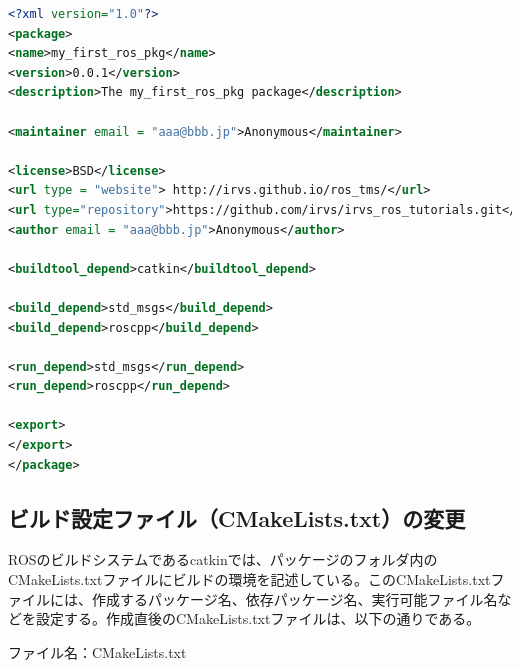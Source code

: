 \begin{lstlisting}[language=XML]
<?xml version="1.0"?>
<package>
<name>my_first_ros_pkg</name>
<version>0.0.1</version>
<description>The my_first_ros_pkg package</description>

<maintainer email = "aaa@bbb.jp">Anonymous</maintainer>

<license>BSD</license>
<url type = "website"> http://irvs.github.io/ros_tms/</url>
<url type="repository">https://github.com/irvs/irvs_ros_tutorials.git</url>
<author email = "aaa@bbb.jp">Anonymous</author>

<buildtool_depend>catkin</buildtool_depend>

<build_depend>std_msgs</build_depend>
<build_depend>roscpp</build_depend>

<run_depend>std_msgs</run_depend>
<run_depend>roscpp</run_depend>

<export>
</export>
</package>
\end{lstlisting}

\subsection{ビルド設定ファイル（CMakeLists.txt）の変更}
ROSのビルドシステムであるcatkinでは、パッケージのフォルダ内のCMakeLists.txtファイルにビルドの環境を記述している。このCMakeLists.txtファイルには、作成するパッケージ名、依存パッケージ名、実行可能ファイル名などを設定する。作成直後のCMakeLists.txtファイルは、以下の通りである。

ファイル名：CMakeLists.txt

